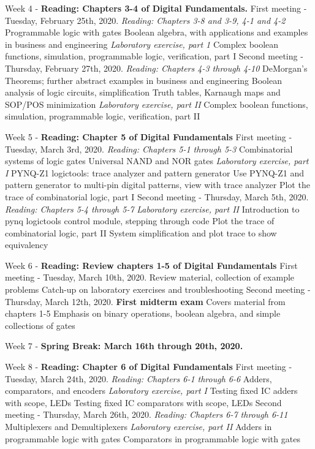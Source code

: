 \documentclass[10pt]{article}
\begin{document}
\begin{outline}[enumerate]
\1 Week 4 - \textbf{Reading: Chapters 3-4 of Digital Fundamentals.}
\2 First meeting - Tuesday, February 25th, 2020. \textit{Reading: Chapters 3-8 and 3-9, 4-1 and 4-2}
\3 Programmable logic with gates
\3 Boolean algebra, with applications and examples in business and engineering
\3 \textit{Laboratory exercise, part 1}
\4 Complex boolean functions, simulation, programmable logic, verification, part I
\2 Second meeting - Thursday, February 27th, 2020.  \textit{Reading: Chapters 4-3 through 4-10}
\3 DeMorgan's Theorems; further abstract examples in business and engineering
\3 Boolean analysis of logic circuits, simplification
\3 Truth tables, Karnaugh maps and SOP/POS minimization
\3 \textit{Laboratory exercise, part II}
\4 Complex boolean functions, simulation, programmable logic, verification, part II

\1 Week 5 - \textbf{Reading: Chapter 5 of Digital Fundamentals}
\2 First meeting - Tuesday, March 3rd, 2020. \textit{Reading:  Chapters 5-1 through 5-3}
\3 Combinatorial systems of logic gates
\3 Universal NAND and NOR gates
\3 \textit{Laboratory exercise, part I}
\4 PYNQ-Z1 logictools: trace analyzer and pattern generator
\4 Use PYNQ-Z1 and pattern generator to multi-pin digital patterns, view with trace analyzer
\4 Plot the trace of combinatorial logic, part I
\2 Second meeting - Thursday, March 5th, 2020. \textit{Reading: Chapters 5-4 through 5-7}
\3 \textit{Laboratory exercise, part II}
\4 Introduction to pynq logictools control module, stepping through code
\4 Plot the trace of combinatorial logic, part II
\4 System simplification and plot trace to show equivalency

\1 Week 6 - \textbf{Reading: Review chapters 1-5 of Digital Fundamentals}
\2 First meeting - Tuesday, March 10th, 2020.
\3 Review material, collection of example problems
\3 Catch-up on laboratory exercises and troubleshooting
\2 Second meeting - Thursday, March 12th, 2020.
\3 \textbf{First midterm exam}
\4 Covers material from chapters 1-5
\4 Emphasis on binary operations, boolean algebra, and simple collections of gates

\1 Week 7 - \textbf{Spring Break: March 16th through 20th, 2020.}

\1 Week 8 - \textbf{Reading: Chapter 6 of Digital Fundamentals}
\2 First meeting - Tuesday, March 24th, 2020. \textit{Reading: Chapters 6-1 through 6-6}
\3 Adders, comparators, and encoders
\3 \textit{Laboratory exercise, part I}
\4 Testing fixed IC adders with scope, LEDs
\4 Testing fixed IC comparators with scope, LEDs
\2 Second meeting - Thursday, March 26th, 2020. \textit{Reading: Chapters 6-7 through 6-11}
\3 Multiplexers and Demultiplexers
\3 \textit{Laboratory exercise, part II}
\4 Adders in programmable logic with gates
\4 Comparators in programmable logic with gates


\end{outline}
\end{document}
